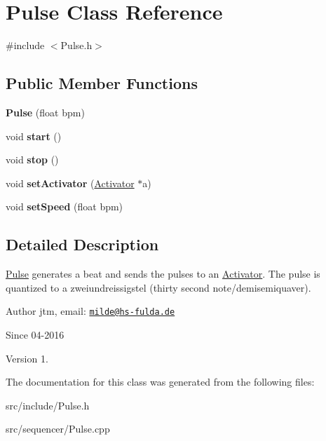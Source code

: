 \hypertarget{classPulse}{\section{Pulse Class Reference}
\label{classPulse}
}


{\ttfamily \#include $<$Pulse.\-h$>$}

\subsection*{Public Member Functions}
\begin{DoxyCompactItemize}
\item 
\hypertarget{classPulse_a9835b637db766732dd508c94fc30c501}{{\bfseries Pulse} (float bpm)}\label{classPulse_a9835b637db766732dd508c94fc30c501}

\item 
\hypertarget{classPulse_a164d81d4e1e798a5eec15b0b030b4047}{void {\bfseries start} ()}\label{classPulse_a164d81d4e1e798a5eec15b0b030b4047}

\item 
\hypertarget{classPulse_a7c8121986bec5319bb097216fe5e93d0}{void {\bfseries stop} ()}\label{classPulse_a7c8121986bec5319bb097216fe5e93d0}

\item 
\hypertarget{classPulse_a8283f4ab252e0c38b1e19a4dec522f23}{void {\bfseries set\-Activator} (\hyperlink{classActivator}{Activator} $\ast$a)}\label{classPulse_a8283f4ab252e0c38b1e19a4dec522f23}

\item 
\hypertarget{classPulse_afc87b2e4120c47942cf03fc82aaf8002}{void {\bfseries set\-Speed} (float bpm)}\label{classPulse_afc87b2e4120c47942cf03fc82aaf8002}

\end{DoxyCompactItemize}


\subsection{Detailed Description}
\hyperlink{classPulse}{Pulse} generates a beat and sends the pulses to an \hyperlink{classActivator}{Activator}. The pulse is quantized to a zweiundreissigstel (thirty second note/demisemiquaver).

\begin{DoxyAuthor}{Author}
jtm, email\-:  \href{mailto:milde@hs-fulda.de}{\tt milde@hs-\/fulda.\-de} 
\end{DoxyAuthor}
\begin{DoxySince}{Since}
04-\/2016 
\end{DoxySince}
\begin{DoxyVersion}{Version}
1. 
\end{DoxyVersion}


The documentation for this class was generated from the following files\-:\begin{DoxyCompactItemize}
\item 
src/include/Pulse.\-h\item 
src/sequencer/Pulse.\-cpp\end{DoxyCompactItemize}

